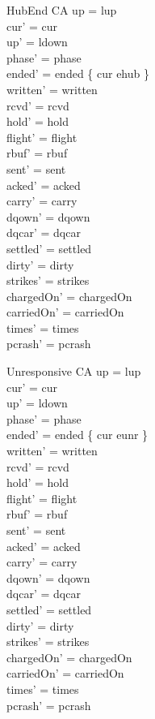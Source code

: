 \documentclass[a4paper,10pt,fleqn]{article}
\begin{document}
\begin{schema}{HubEnd}
  \Delta CA
\where
  up = lup \\
  cur' = cur \\
  up' = ldown \\
  phase' = phase \\
  ended' = ended \oplus \{ cur \mapsto ehub \} \\
  written' = written \\
  rcvd' = rcvd \\
  hold' = hold \\
  flight' = flight \\
  rbuf' = rbuf \\
  sent' = sent \\
  acked' = acked \\
  carry' = carry \\
  dqown' = dqown \\
  dqcar' = dqcar \\
  settled' = settled \\
  dirty' = dirty \\
  strikes' = strikes \\
  chargedOn' = chargedOn \\
  carriedOn' = carriedOn \\
  times' = times \\
  pcrash' = pcrash
\end{schema}

\begin{schema}{Unresponsive}
  \Delta CA
\where
  up = lup \\
  cur' = cur \\
  up' = ldown \\
  phase' = phase \\
  ended' = ended \oplus \{ cur \mapsto eunr \} \\
  written' = written \\
  rcvd' = rcvd \\
  hold' = hold \\
  flight' = flight \\
  rbuf' = rbuf \\
  sent' = sent \\
  acked' = acked \\
  carry' = carry \\
  dqown' = dqown \\
  dqcar' = dqcar \\
  settled' = settled \\
  dirty' = dirty \\
  strikes' = strikes \\
  chargedOn' = chargedOn \\
  carriedOn' = carriedOn \\
  times' = times \\
  pcrash' = pcrash
\end{schema}
\end{document}
